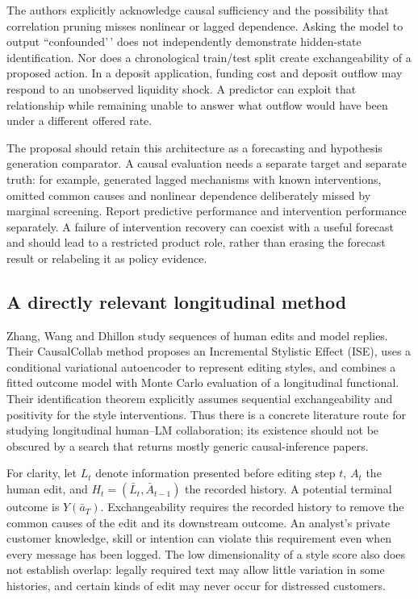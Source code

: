 The authors explicitly acknowledge causal sufficiency and the
possibility that correlation pruning misses nonlinear or lagged
dependence. Asking the model to output ``confounded'\,' does not
independently demonstrate hidden-state identification. Nor does a
chronological train/test split create exchangeability of a proposed
action. In a deposit application, funding cost and deposit outflow may
respond to an unobserved liquidity shock. A predictor can exploit that
relationship while remaining unable to answer what outflow would have
been under a different offered rate.

The proposal should retain this architecture as a forecasting and
hypothesis generation comparator. A causal evaluation needs a separate
target and separate truth: for example, generated lagged mechanisms with
known interventions, omitted common causes and nonlinear dependence
deliberately missed by marginal screening. Report predictive performance
and intervention performance separately. A failure of intervention
recovery can coexist with a useful forecast and should lead to a
restricted product role, rather than erasing the forecast result or
relabeling it as policy evidence.

\hypertarget{a-directly-relevant-longitudinal-method}{%
\subsection{A directly relevant longitudinal
method}\label{a-directly-relevant-longitudinal-method}}

Zhang, Wang and Dhillon study sequences of human edits and model
replies. Their CausalCollab method proposes an Incremental Stylistic
Effect (ISE), uses a conditional variational autoencoder to represent
editing styles, and combines a fitted outcome model with Monte Carlo
evaluation of a longitudinal functional. Their identification theorem
explicitly assumes sequential exchangeability and positivity for the
style interventions. Thus there is a concrete literature route for
studying longitudinal human--LM collaboration; its existence should not
be obscured by a search that returns mostly generic causal-inference
papers. \citep{exec13_census_collaboration}

For clarity, let \(L_t\) denote information presented before editing
step \(t\), \(A_t\) the human edit, and \(H_t=(\bar L_t,\bar A_{t-1})\)
the recorded history. A potential terminal outcome is \(Y(\bar a_T)\).
Exchangeability requires the recorded history to remove the common
causes of the edit and its downstream outcome. An analyst's private
customer knowledge, skill or intention can violate this requirement even
when every message has been logged. The low dimensionality of a style
score also does not establish overlap: legally required text may allow
little variation in some histories, and certain kinds of edit may never
occur for distressed customers.

